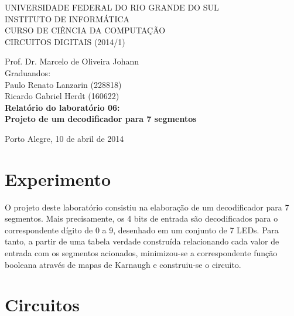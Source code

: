\documentclass[a4paper]{article}
\begin{document}
\begin{titlepage}
\begin{center}


\large{ 
\uppercase{ Universidade Federal do Rio Grande do Sul\\

Instituto de Informática \\

Curso de Ciência da Computação \\

Circuitos Digitais (2014/1)\\
}

Prof. Dr. Marcelo de Oliveira Johann \\

Graduandos: \\ Paulo Renato Lanzarin (228818)
			\\ Ricardo Gabriel Herdt (160622) \\ [4.5cm]


\LARGE {\bfseries Relatório do laboratório 06: \\
	Projeto de um decodificador para 7 segmentos\\[1.0cm]
}}


\vfill

Porto Alegre, 10 de abril de 2014

\end{center}
\end{titlepage}
\section{Experimento}

	O projeto deste laboratório consistiu na elaboração de um decodificador
para 7 segmentos. Mais precisamente, os 4 bits de entrada são decodificados
para o correspondente dígito de 0 a 9, desenhado em um conjunto de 7 LEDs. Para
 tanto, a partir de uma tabela verdade construída relacionando cada valor de
entrada com os segmentos acionados, minimizou-se a correspondente função
booleana através de mapas de Karnaugh e construiu-se o circuito.



\section{Circuitos}
\end{document}
